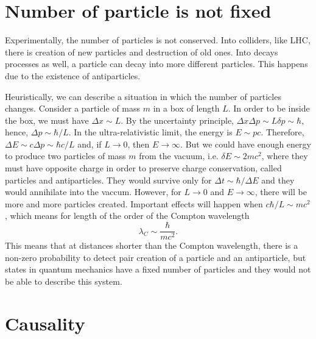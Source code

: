 \section{Number of particle is not fixed}

    Experimentally, the number of particles is not conserved. Into colliders, like LHC, there is creation of new particles and destruction of old ones. Into decays processes as well, a particle can decay into more different particles. This happens due to the existence of antiparticles. 

    Heuristically, we can describe a situation in which the number of particles changes. Consider a particle of mass $m$ in a box of length $L$. In order to be inside the box, we must have $\Delta x \sim L$. By the uncertainty principle, $\Delta x \Delta p \sim L \delta p \sim \hbar$, hence, $\Delta p \sim \hbar / L$. In the ultra-relativistic limit, the energy is $E \sim p c$. Therefore, $\Delta E \sim c \Delta p \sim \hbar c / L$ and, if $L \rightarrow 0$, then $E \rightarrow \infty$. But we could have enough energy to produce two particles of mass $m$ from the vacuum, i.e. $\delta E \sim 2 m c^2$, where they must have opposite charge in order to preserve charge conservation, called particles and antiparticles. They would survive only for $\Delta t \sim \hbar / \Delta E$ and they would annihilate into the vaccum. However, for $L \rightarrow 0$ and $E \rightarrow \infty$, there will be more and more particles created. Important effects will happen when $c \hbar / L \sim m c^2$, which means for length of the order of the Compton wavelength
    \begin{equation*}
        \lambda_C \sim \frac{\hbar}{mc^2} .
    \end{equation*}
    This means that at distances shorter than the Compton wavelength, there is a non-zero probability to detect pair creation of a particle and an antiparticle, but states in quantum mechanics have a fixed number of particles and they would not be able to describe this system.

\section{Causality}

